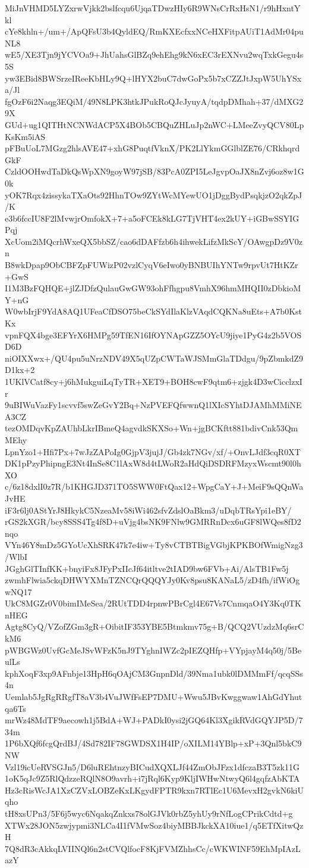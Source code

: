 MiJnVHMD5LYZxrwVjkk2bslfcqu6UjqaTDwzHIy6R9WNsCrRxHsN1/r9hHxntYkl
cYe8khln+/um+/ApQFsU3b4QyldEQ/RmKXEcfxxNCeHXFitpAUiT1AdMr04puNL8
wE5/XE3Tjn9jYCVOa9+JhUahsGlBZq9ehEhg9kN6xEC3rEXNvu2wqTxkGegu4s5S
yw3EBid8BWSrzeIReeKbHLy9Q+lHYX2buC7dwGoPx5b7xCZZJtJxpW5UhYSxa/Jl
fgOzF6i2Naqg3EQiM/49N8LPK3htkJPukRoQJcJyuyA/tqdpDMhah+37/dMXG29X
GUd+ug1QITHtNCNWdACP5X4BOb5CBQuZHLuJp2nWC+LMeeZvyQCV80LpKsKm5iAS
pFBuUoL7MGzg2hlsAVE47+xhG8PuqtfVknX/PK2LlYkmGGlblZE76/CRkhqrdGkF
CzldOOHwdTaDkQsWpXN9goyW97jSB/83PcA0ZPI5LeJgvpOaJX8nZvj6oz8w1G0k
yOK7Rqx4zissykaTXaOts92HhnTOw9ZYtWcMYewUO1jDggBydPsqkjzO2qkZpJ/K
e3b6fccIU8F2lMvwjrOmfokX+7+a5oFCEk8kLG7TjVHT4ex2kUY+iGBwSSYIGPqj
XcUom2iMQcrhWxeQX5bbSZ/cao6dDAFfzb6h4ihwekLifzMkScY/OAwgpDz9V0zn
B8wkDpap9ObCBFZpFUWizP02vzlCyqV6eIwo0yBNBUIhYNTw9rpvUt7HtKZr+GwS
I1M3BzFQHQE+jlZJDfzQulauGwGW93ohFfhgpu8VmhX96hmMHQII0zDbkioMY+nG
W0wbIrjF9YdA8AQ1UFeaCfDSO75beCkSYdIlaKlzVAqdCQKNa8uEts+A7b0KstKx
vpnFQX4bge3EFYrX6HMPg59TfEN16IfOYNApGZZ5OYcU9jiye1PyG4z2b5VOSD6D
niOIXXwx+/QU4pu5uNrzNDV49X5qUZpCWTaWJSMmGlaTDdgu/9pZbmkdZ9D1kx+2
1UKlVCatf8cy+j6hMukguiLqTyTR+XET9+BOH8cwF9qtm6+zjgk4D3wCicclzxIr
9uBIWuVazFy1scvvf5swZeGvY2Bq+NzPVEFQfwwnQ1lXIcSYhtDJAMhMMiNEA3CZ
tezOMDqvKpZAUhbLkrIBmeQ4agvdkSKXSo+Wn+jgBCKftt881bdivCnk53QmMEhy
LpnYzo1+Hfi7Px+7wJzZAPoIg0GjpV3jujJ/Gb4zk7NGv/xf/+OnvLJdf3cqR0XT
DK1pPzyPhipngE3Nt4InSe8C1lAxW8d4tLWoR2aHdQiDSDRFMzyxWscmt90l0hXO
c/6z18dxlI0z7R/b1KHGJD371TO5SWW0FtQax12+WpgCaY+J+MeiF9sQQnWaJvHE
iF3r6lj0AStYrJ8HkykC5NzeaMv58iWi462sfvZdslOaBkm3/uDqbTRsYpi1eBY/
rGS2kXGR/bcy8SSS4Tg4f8D+uVjg4bsNK9FNlw9GMRRnDcx6uGF8lWQes8fD2nqo
VYn46Y8mDz5GYoUcXhSRK47k7e4iw+Ty8vCTBTBigVGbjKPKBOfWmigNzg3/WlbI
JGghGlTInfKK+bnyiFx8JFyPxIIcJf64itltve2tIAD9bw6FVb+Ai/AlsTB1Fw5j
zwmhFlwia5ckqDHWYXMnTZNCQrQQQYJy0Kv8psu8KANaL5/zD4fh/ifWiOgwNQ17
UkC8MGZr0V0bimIMeSea/2RUtTDD4rpnwPBrCgl4E67Vs7CnmqaO4Y3Kq0TKnHEG
Agtg8CyQ/VZofZGm3gR+OibitIF353YBE5Btmkmv75g+B/QCQ2VUzdzMq6srCkM6
pWBGWz0UvfGcMeJSvWFzK5nJ9TYghnIWZc2pIEZQHfp+VYpjayM4q50j/5BeulLs
kphXoqF3xp9AFnbje13HpH6qOAjCM3GnpnDld/39Nma1ubk0lDMMmFf/qcqSSs4n
Uemlab5JgRgRRgfT8aV3b4VuJWfFsEP7DMU+Wwu5JBvKwggwaw1AhGdYhutqa6Ts
mrWz48MdTF9aecowh1j5BdA+WJ+PADkI0ysi2jGQ64Kl3XgikRVdGQYJP5D/734m
1P6bXQf6fcgQrdBJ/4Sd782IF78GWDSX1H4IP/oXILM14YBlp+xP+3Qnl5bkC9NW
Vzl19icUeRVSGJn5/D6luREhtnzyBICudXQXLJf44ZmObJFzx1dfczaB3T5zk11G
1oK5qJc9Z5RlQdzzeRQlN8O9avrh+i7jRql6Kyp9KljIWHwNtwyQ6l4gqfzAbKTA
Hz3cRisWcJA1XzCZVxLOBZeKxLKgydFPTR9kxn7RTlEc1U6MevxH2gvkN6kiUqho
tH8xsUPn3/5F6j5wyc6NqakqZnkxs78olGJVk0rbZ5yhUy9rNfLogCPrikCdtd+g
XTWx28JON5zwjypmi3NLCa4I1fVMwSoz4biyMBBJkckXA10iue1/q5ETfXitwQzH
7Q8dR3cAkkqLVIINQl6n2stCVQlfocF8KjFVMZhhsCc/cWKWINF59EhMpIAzLazY
